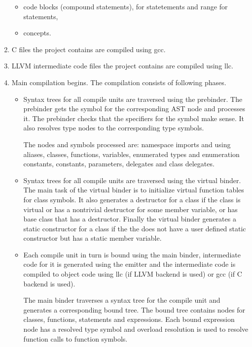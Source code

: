 \documentclass[oneside, a4paper, 11pt]{article}
\begin{document}
\begin{enumerate}
\begin{itemize}
\item
code blocks (compound statements), for statetements and range for statements,

\item
concepts.

\end{itemize}

\item
C files the project contains are compiled using gcc.

\item
LLVM intermediate code files the project contains are compiled using llc.

\item
Main compilation begins. The compilation consists of following phases.

\begin{itemize}

\item
Syntax trees for all compile units are traversed using the prebinder.
The prebinder gets the symbol for the corresponding AST node and
processes it.
The prebinder checks that the specifiers for the symbol make sense.
It also resolves type nodes to the corresponding type symbols.

The nodes and symbols processed are:
namespace imports and using aliases, classes, functions, variables, enumerated types
and enumeration constants, constants, parameters, delegates and class delegates.

\item
Syntax trees for all compile units are traversed using the virtual binder.
The main task of the virtual binder is to initialize virtual function tables for
class symbols.
It also generates a destructor for a class if the class is virtual or has a nontrivial
destructor for some member variable, or has base class that has a destructor.
Finally the virtual binder generates a static constructor for a class if the
the does not have a user defined static constructor but has a static member variable.

\item
Each compile unit in turn is bound using the main binder,
intermediate code for it is generated using the emitter and
the intermediate code is compiled to object code using llc (if LLVM backend is used)
or gcc (if C backend is used).

The main binder traverses a syntax tree for the compile unit and generates
a corresponding bound tree.
The bound tree contains nodes for classes, functions, statements and expressions.
Each bound expression node has a resolved type symbol and
overload resolution is used to resolve function calls to function symbols.


\end{itemize}
\end{enumerate}
\end{document}
